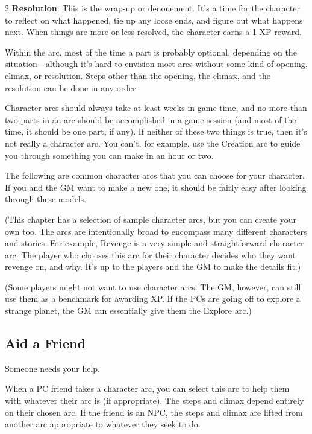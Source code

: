 \begin{multicols}{2}
\textbf{Resolution}: This is the wrap-up or denouement. It’s a time for the character to reflect on what happened, tie up any loose ends, and figure out what happens next. When things are more or less resolved, the character earns a 1 XP reward.

Within the arc, most of the time a part is probably optional, depending on the situation—although it’s hard to envision most arcs without some kind of opening, climax, or resolution. Steps other than the opening, the climax, and the resolution can be done in any order.

Character arcs should always take at least weeks in game time, and no more than two parts in an arc should be accomplished in a game session (and most of the time, it should be one part, if any). If neither of these two things is true, then it’s not really a character arc. You can’t, for example, use the Creation arc to guide you through something you can make in an hour or two.

The following are common character arcs that you can choose for your character. If you and the GM want to make a new one, it should be fairly easy after looking through these models.

(This chapter has a selection of sample character arcs, but you can create your own too. The arcs are intentionally broad to encompass many different characters and stories. For example, Revenge is a very simple and straightforward character arc. The player who chooses this arc for their character decides who they want revenge on, and why. It’s up to the players and the GM to make the details fit.)

(Some players might not want to use character arcs. The GM, however, can still use them as a benchmark for awarding XP. If the PCs are going off to explore a strange planet, the GM can essentially give them the Explore arc.)

\subsection{Aid a Friend}

Someone needs your help.

When a PC friend takes a character arc, you can select this arc to help them with whatever their arc is (if appropriate). The steps and climax depend entirely on their chosen arc. If the friend is an NPC, the steps and climax are lifted from another arc appropriate to whatever they seek to do.


\end{multicols}
